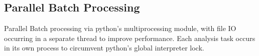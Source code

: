 \subsection{Parallel Batch Processing}
\label{batch_processing}

Parallel Batch processing via python's multiprocessing module, with file IO occurring in a separate thread to improve performance.  Each analysis task occurs in its own process to circumvent python's global interpreter lock.